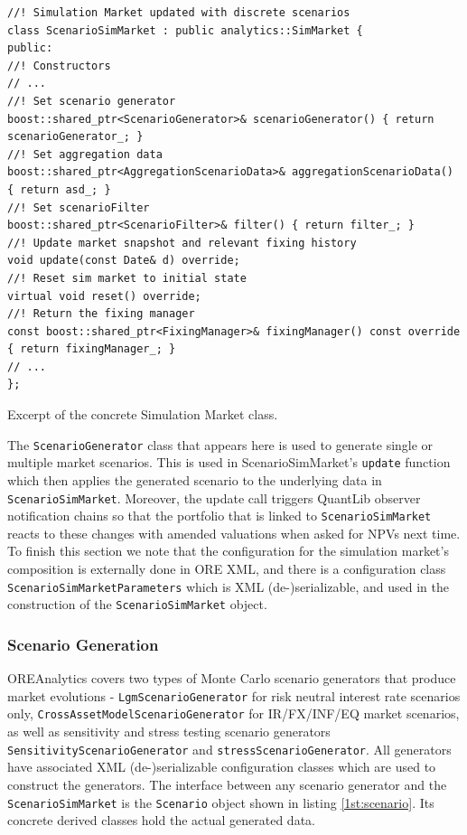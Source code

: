 \documentclass[12pt, a4paper]{report}
\begin{document}
\begin{listing}[H]
\begin{verbatim}
//! Simulation Market updated with discrete scenarios
class ScenarioSimMarket : public analytics::SimMarket {
public:
//! Constructors
// ...
//! Set scenario generator
boost::shared_ptr<ScenarioGenerator>& scenarioGenerator() { return scenarioGenerator_; }
//! Set aggregation data
boost::shared_ptr<AggregationScenarioData>& aggregationScenarioData() { return asd_; }
//! Set scenarioFilter
boost::shared_ptr<ScenarioFilter>& filter() { return filter_; }
//! Update market snapshot and relevant fixing history
void update(const Date& d) override;
//! Reset sim market to initial state
virtual void reset() override;
//! Return the fixing manager
const boost::shared_ptr<FixingManager>& fixingManager() const override { return fixingManager_; }
// ...
};
\end{verbatim}
\caption{Excerpt of the concrete Simulation Market class.}
\label{1st:scenariosimmarket}
\end{listing}

The {\tt ScenarioGenerator} class that appears here is used to generate single or multiple market scenarios. This is used in ScenarioSimMarket's {\tt update} function which then
applies the generated scenario to the underlying data in {\tt ScenarioSimMarket}. Moreover, the update call triggers QuantLib observer notification chains so that the portfolio that is linked to {\tt ScenarioSimMarket} reacts to these changes with amended
valuations when asked for NPVs next time. To finish this section we note that the configuration for the simulation market's composition is externally done in ORE XML, and there is a configuration class {\tt ScenarioSimMarketParameters} which is XML (de-)serializable, and used in the construction of the {\tt ScenarioSimMarket} object.

\subsubsection{Scenario Generation}
OREAnalytics covers two types of Monte Carlo scenario generators that produce market evolutions - {\tt LgmScenarioGenerator} for risk neutral interest rate scenarios only,
{\tt CrossAssetModelScenarioGenerator} for IR/FX/INF/EQ market scenarios, as well as sensitivity and stress testing scenario generators {\tt SensitivityScenarioGenerator} and {\tt stressScenarioGenerator}. 
All generators have associated XML (de-)serializable configuration classes which are used to construct the generators. 
The interface between any scenario generator and the {\tt ScenarioSimMarket} is the {\tt Scenario} object shown in listing \ref{1st:scenario}. Its concrete derived classes hold the actual generated data.
\end{document}
